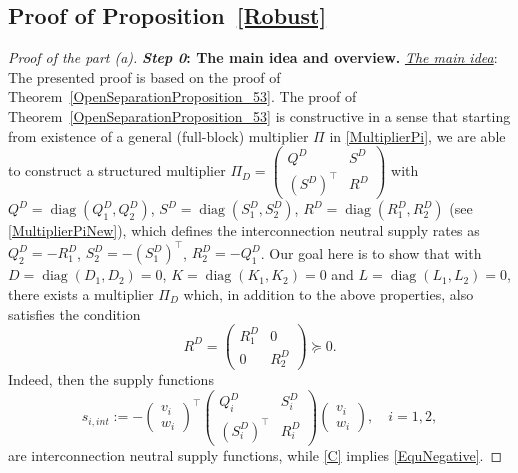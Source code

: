 \documentclass[11pt,a4paper,oneside,DIV=12,headings=small]{scrartcl}
\newcommand{\diag}{\operatorname{diag}}
\theoremstyle{plain}
\begin{document}
\subsection{Proof of Proposition~\ref{Robust}}
\label{Sec6_C}
\begin{proof}[Proof of the part (a)]

\textbf{\emph{Step 0}: The main idea and overview.} \newline
\underline{\emph{The main idea}}: The presented proof is based on the proof of Theorem~\ref{OpenSeparationProposition_53}. The proof of Theorem~\ref{OpenSeparationProposition_53} is constructive in a sense that starting from existence of a general (full-block) multiplier $\Pi$ in \eqref{MultiplierPi}, we are able to construct a structured multiplier $\Pi_D =\left(\begin{smallmatrix} Q^D & S^D \\ (S^D)^\top & R^D \end{smallmatrix}\right)$ with $Q^D=\diag(Q^D_1,Q^D_2)$, $S^D=\diag(S^D_1,S^D_2)$, $R^D=\diag(R^D_1,R^D_2)$ (see \eqref{MultiplierPiNew}), which defines the interconnection neutral supply rates as $Q^D_2=-R^D_1$, $S^D_2=-(S^D_1)^\top$, $R^D_2=-Q^D_1$. Our goal here is to show that with $D=\diag(D_1,D_2)=0$, $K=\diag(K_1,K_2)=0$ and $L=\diag(L_1,L_2)=0$, there exists a multiplier $\Pi_D$ which, in addition to the above properties, also satisfies the condition
\begin{equation}
 \label{C} 
R^D = \begin{pmatrix} R^D_1 & 0 \\ 0& R^D_2 \end{pmatrix}\succeq 0. 
\end{equation}
Indeed, then the supply functions
\begin{equation} 
\label{sIint}
s_{i,int}:=-\left(\begin{smallmatrix} v_i \\ w_i \end{smallmatrix}\right)^\top\left(\begin{smallmatrix} Q^D_i & S^D_i \\ (S^D_i)^\top & R^D_i \end{smallmatrix}\right)\left(\begin{smallmatrix} v_i \\ w_i \end{smallmatrix}\right), \quad  i=1,2,
\end{equation}
are interconnection neutral supply functions, while \eqref{C} implies \eqref{EquNegative}. 


\end{proof}
\end{document}
